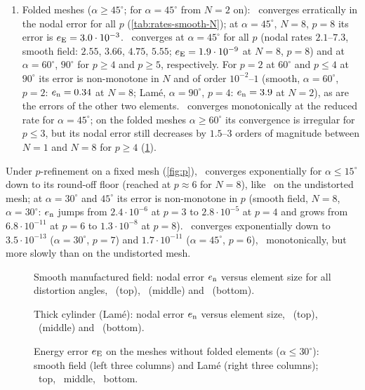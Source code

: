 \begin{enumerate}
  $6.02$; Lam\'e: $1.96$--$7.87$); at $N=8$ its energy error is $8$--$2.6\cdot10^4$ times smaller
  than that of \PP; compared with \PM\ it is equal at $p=2$ and $1.4$--$2.0\cdot10^5$ times smaller
  for $p\ge3$ (smooth). \PP\ converges with $\approx\lfloor p/2\rfloor$.
\item Folded meshes ($\alpha\ge45^\circ$; for $\alpha=45^\circ$ from $N=2$ on): \PM\ converges
  erratically in the nodal error for all $p$ (\cref{tab:rates-smooth-N}); at $\alpha=45^\circ$,
  $N=8$, $p=8$ its error is $e_{\mathrm{E}}=3.0\cdot10^{-3}$. \PH\ converges at $\alpha=45^\circ$ for all
  $p$ (nodal rates $2.1$--$7.3$, smooth field: $2.55$, $3.66$, $4.75$, $5.55$; $e_{\mathrm{E}}=1.9\cdot10^{-9}$ at
  $N=8$, $p=8$) and at $\alpha=60^\circ$, $90^\circ$ for $p\ge4$ and $p\ge5$, respectively. For $p=2$
  at $60^\circ$ and $p\le4$ at $90^\circ$ its error is non-monotone in $N$ and of order
  $10^{-2}$--$1$ (smooth, $\alpha=60^\circ$, $p=2$: $e_{\mathrm{n}}=0.34$ at $N=8$; Lam\'e, $\alpha=90^\circ$, $p=4$:
  $e_{\mathrm{n}}=3.9$ at $N=2$), as are the errors of the other two elements. \PP\
  converges monotonically at the reduced rate for $\alpha=45^\circ$; on the folded meshes
  $\alpha\ge60^\circ$ its convergence is irregular for $p\le3$, but its nodal error still
  decreases by $1.5$--$3$ orders of magnitude between $N=1$ and $N=8$ for $p\ge4$
  (\cref{fig:h-smooth}).
\end{enumerate}
Under $p$-refinement on a fixed mesh (\cref{fig:p}), \PM\ converges exponentially for
$\alpha\le15^\circ$ down to its round-off floor (reached at $p\approx6$ for $N=8$), like \PP\ on the
undistorted mesh; at $\alpha=30^\circ$ and $45^\circ$ its error is non-monotone in $p$ (smooth
field, $N=8$, $\alpha=30^\circ$: $e_{\mathrm{n}}$ jumps from $2.4\cdot10^{-6}$ at $p=3$ to $2.8\cdot10^{-5}$ at
$p=4$ and grows from $6.8\cdot10^{-11}$ at $p=6$ to $1.3\cdot10^{-8}$ at $p=8$). \PH\ converges
exponentially down to $3.5\cdot10^{-13}$ ($\alpha=30^\circ$, $p=7$) and $1.7\cdot10^{-11}$
($\alpha=45^\circ$, $p=6$), \PP\ monotonically, but more slowly than on the undistorted mesh.

\begin{figure}[p]
  \centering
  
  \caption{Smooth manufactured field: nodal error $e_{\mathrm{n}}$ versus element size for all
    distortion angles, \PM\ (top), \PH\ (middle) and \PP\ (bottom).}
  \label{fig:h-smooth}
\end{figure}
\begin{figure}[p]
  \centering
  
  \caption{Thick cylinder (Lam\'e): nodal error $e_{\mathrm{n}}$ versus element size, \PM\ (top), \PH\
    (middle) and \PP\ (bottom).}
  \label{fig:h-lame}
\end{figure}
\begin{figure}[t]
  \centering
  
  \caption{Energy error $e_{\mathrm{E}}$ on the meshes without folded elements
    ($\alpha\le30^\circ$): smooth field (left three columns) and Lam\'e (right three
    columns); \PM\ top, \PH\ middle, \PP\ bottom.}
  \label{fig:h-smooth-E}
\end{figure}

